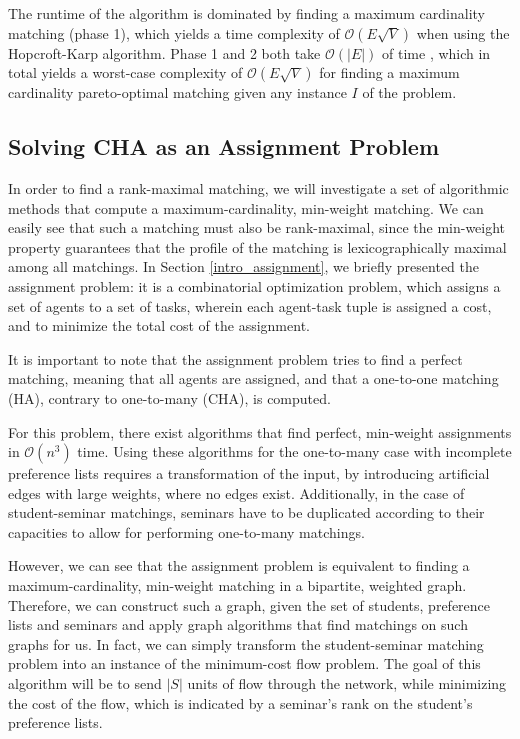 The runtime of the algorithm is dominated by finding a maximum cardinality matching (phase 1), which yields a time complexity of $\mathcal{O}(E\sqrt{V})$ \cite{Abraham:Pacha} when using the Hopcroft-Karp algorithm. Phase 1 and 2 both take $\mathcal{O}(|E|)$ of time \cite{SngThesis}, which in total yields a worst-case complexity of $\mathcal{O}(E\sqrt{V})$ for finding a maximum cardinality pareto-optimal matching given any instance $I$ of the problem.

\subsection{Solving CHA as an Assignment Problem}\label{algo:assignment}
In order to find a rank-maximal matching, we will investigate a set of algorithmic methods that compute a maximum-cardinality, min-weight matching. We can easily see that such a matching must also be rank-maximal, since the min-weight property guarantees that the profile of the matching is lexicographically maximal among all matchings.
In Section \ref{intro_assignment}, we briefly presented the assignment problem: it is a combinatorial optimization problem, which assigns a set of agents to a set of tasks, wherein each agent-task tuple is assigned a cost, and to minimize the total cost of the assignment. 

It is important to note that the assignment problem tries to find a perfect matching, meaning that all agents are assigned, and that a one-to-one matching (HA), contrary to one-to-many (CHA), is computed.

For this problem, there exist algorithms \cite{Munkres, Jonker1987} that find perfect, min-weight assignments in $\mathcal{O}(n^3)$ time. Using these algorithms for the one-to-many case with incomplete preference lists requires a transformation of the input, by introducing artificial edges with large weights, where no edges exist. Additionally, in the case of student-seminar matchings, seminars have to be duplicated according to their capacities to allow for performing one-to-many matchings.
  
However, we can see that the assignment problem is equivalent to finding a maximum-cardinality, min-weight matching in a bipartite, weighted graph. Therefore, we can construct such a graph, given the set of students, preference lists and seminars and apply graph algorithms that find matchings on such graphs for us. In fact, we can simply transform the student-seminar matching problem into an instance of the minimum-cost flow problem. The goal of this algorithm will be to send $|S|$ units of flow through the network, while minimizing the cost of the flow, which is indicated by a seminar's rank on the student's preference lists.

